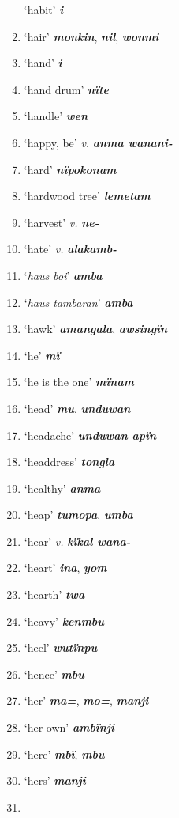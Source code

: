 \begin{enumerate}[noitemsep, label={}, align=left, widest=190, labelsep=1ex,leftmargin=*,itemindent=-10pt]
‘habit’ \textbf{\textit{i}} \item
‘hair’ \textbf{\textit{monkin}}, \textbf{\textit{nil}}, \textbf{\textit{wonmi}} \item
‘hand’ \textbf{\textit{i}} \item
‘hand drum’ \textbf{\textit{nïte}} \item
‘handle’ \textbf{\textit{wen}} \item
‘happy, be’ \textit{v.} \textbf{\textit{anma wanani-}} \item
‘hard’ \textbf{\textit{nïpokonam}} \item
‘hardwood tree’ \textbf{\textit{lemetam}} \item
‘harvest’ \textit{v.} \textbf{\textit{ne-}} \item
‘hate’ \textit{v.} \textbf{\textit{alakamb-}} \item
‘\textit{haus boi}’ \textbf{\textit{amba}} \item
‘\textit{haus tambaran}’ \textbf{\textit{amba}} \item
‘hawk’ \textbf{\textit{amangala}}, \textbf{\textit{awsingïn}} \item
‘he’ \textbf{\textit{mï}} \item
‘he is the one’ \textbf{\textit{mïnam}} \item
‘head’ \textbf{\textit{mu}}, \textbf{\textit{unduwan}} \item
‘headache’ \textbf{\textit{unduwan apïn}} \item
‘headdress’ \textbf{\textit{tongla}} \item
‘healthy’ \textbf{\textit{anma}} \item
‘heap’ \textbf{\textit{tumopa}}, \textbf{\textit{umba}} \item
‘hear’ \textit{v.} \textbf{\textit{kïkal wana-}} \item
‘heart’ \textbf{\textit{ina}}, \textbf{\textit{yom}} \item
‘hearth’ \textbf{\textit{twa}} \item
‘heavy’ \textbf{\textit{kenmbu}} \item
‘heel’ \textbf{\textit{wutïnpu}} \item
‘hence’ \textbf{\textit{mbu}} \item
‘her’ \textbf{\textit{ma=}}, \textbf{\textit{mo=}}, \textbf{\textit{manji}} \item
‘her own’ \textbf{\textit{ambïnji}} \item
‘here’ \textbf{\textit{mbï}}, \textbf{\textit{mbu}} \item
‘hers’ \textbf{\textit{manji}} \item

\end{enumerate}
